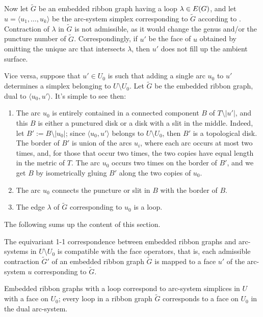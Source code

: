Now let ${\tilde G}$ be an embedded ribbon graph having a loop $\lambda \in
E(G)$, and let $u = \langle u_1, \ldots, u_k\rangle$ be the arc-system simplex
corresponding to ${\tilde G}$ according to .
Contraction of $\lambda$ in ${\tilde G}$ is not admissible, as it would change
the genus and/or the puncture number of ${\tilde G}$.  Correspondingly,
if $u'$ be the face of $u$ obtained by omitting the unique arc
that intersects $\lambda$, then $u'$ does not fill up the ambient surface.

Vice versa, suppose that $u' \in U_0$ is such that adding a single arc
$u_0$ to $u'$ determines a simplex belonging to $U \setminus U_0$.  Let
${\tilde G}$ be the embedded ribbon graph, dual to $\langle u_0, u'\rangle$.  It's
simple to see then:
\begin{enumerate}
\item The arc $u_0$ is entirely contained in a connected component $B$
  of $T \setminus |u'|$, and this $B$ is either a punctured disk or a disk
  with a slit in the middle.  Indeed, let $B' := B \setminus |u_0|$; since
  $\langle u_0, u'\rangle$ belongs to $U \setminus U_0$, then $B'$ is a topological disk.
  The border of $B'$ is union of the arcs $u_i$, where each arc occurs
  at most two times, and, for those that occur two times, the two
  copies have equal length in the metric of $T$.  The arc $u_0$ occurs
  two times on the border of $B'$, and we get $B$ by isometrically
  gluing $B'$ along the two copies of $u_0$. 
\item The arc $u_0$ connects the puncture or slit in $B$ with the
  border of $B$.
\item The edge $\lambda$ of ${\tilde G}$ corresponding to $u_0$ is a loop.
\end{enumerate}

The following sums up the content of this section.
\begin{lemma}
  \label{lemma:erg-loop}
  The equivariant 1-1 correspondence between embedded ribbon graphs
  and arc-systems in $U \setminus U_0$ is compatible with the face operators,
  that is, each admissible contraction ${\tilde G'}$ of an embedded
  ribbon graph ${\tilde G}$ is mapped to a face $u'$ of the arc-system
  $u$ corresponding to ${\tilde G}$.

  Embedded ribbon graphs with a loop correspond to arc-system simplices
  in $U$ with a face on $U_0$; every loop in a ribbon graph ${\tilde G}$
  corresponds to a face on $U_0$ in the dual arc-system.
\end{lemma}



